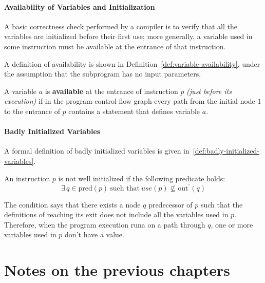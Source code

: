 \documentclass[english]{article}
\begin{document}
\paragraph{Availability of Variables and Initialization}

A basic correctness check performed by a compiler is to verify that all the variables are initialized before their first use;
more generally, a variable used in some instruction must be available at the entrance of that instruction.

A definition of availability is shown in Definition~\ref{def:variable-availability}, under the assumption that the subprogram has no input parameters.

\begin{definition}
  \label{def:variable-availability}
  A variable \(a\) is \textbf{available} at the entrance of instruction \(p\) \textit{(just before its execution)} if in the program control-flow graph every path from the initial node \(1\) to the entrance of \(p\) contains a statement that defines variable \(a\).
\end{definition}

\paragraph{Badly Initialized Variables}

A formal definition of badly initialized variables is given in~\ref{def:badly-initialized-variables}.

\begin{definition}
  \label{def:badly-initialized-variables}
  An instruction \(p\) is not well initialized if the following predicate holds:
  \[ \exists \, q \in \text{pred}(p) \ \text{such that} \ use(p) \nsubseteq \text{out}^\prime(q) \]
\end{definition}

The condition says that there exists a node \(q\) predecessor of \(p\) such that the definitions of reaching its exit does not include all the variables used in \(p\).
Therefore, when the program execution runa on a path through \(q\), one or more variables used in \(p\) don't have a value.

\clearpage

\section{Notes on the previous chapters}
\end{document}
